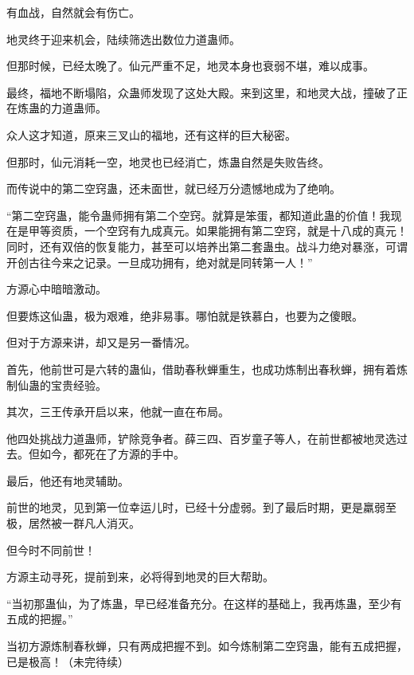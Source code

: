 \begin{this_body}
有血战，自然就会有伤亡。

地灵终于迎来机会，陆续筛选出数位力道蛊师。

但那时候，已经太晚了。仙元严重不足，地灵本身也衰弱不堪，难以成事。

最终，福地不断塌陷，众蛊师发现了这处大殿。来到这里，和地灵大战，撞破了正在炼蛊的力道蛊师。

众人这才知道，原来三叉山的福地，还有这样的巨大秘密。

但那时，仙元消耗一空，地灵也已经消亡，炼蛊自然是失败告终。

而传说中的第二空窍蛊，还未面世，就已经万分遗憾地成为了绝响。

“第二空窍蛊，能令蛊师拥有第二个空窍。就算是笨蛋，都知道此蛊的价值！我现在是甲等资质，一个空窍有九成真元。如果能拥有第二空窍，就是十八成的真元！同时，还有双倍的恢复能力，甚至可以培养出第二套蛊虫。战斗力绝对暴涨，可谓开创古往今来之记录。一旦成功拥有，绝对就是同转第一人！”

方源心中暗暗激动。

但要炼这仙蛊，极为艰难，绝非易事。哪怕就是铁慕白，也要为之傻眼。

但对于方源来讲，却又是另一番情况。

首先，他前世可是六转的蛊仙，借助春秋蝉重生，也成功炼制出春秋蝉，拥有着炼制仙蛊的宝贵经验。

其次，三王传承开启以来，他就一直在布局。

他四处挑战力道蛊师，铲除竞争者。薛三四、百岁童子等人，在前世都被地灵选过去。但如今，都死在了方源的手中。

最后，他还有地灵辅助。

前世的地灵，见到第一位幸运儿时，已经十分虚弱。到了最后时期，更是羸弱至极，居然被一群凡人消灭。

但今时不同前世！

方源主动寻死，提前到来，必将得到地灵的巨大帮助。

“当初那蛊仙，为了炼蛊，早已经准备充分。在这样的基础上，我再炼蛊，至少有五成的把握。”

当初方源炼制春秋蝉，只有两成把握不到。如今炼制第二空窍蛊，能有五成把握，已是极高！（未完待续）

\end{this_body}

